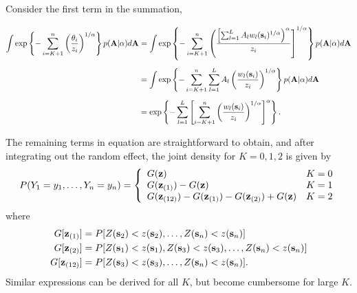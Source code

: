 \documentclass[11pt]{article}
\begin{document}
Consider the first term in the summation,

\begin{align}
	\int \exp \left\{ -\sum_{ i = K+1}^{ n }\left( \frac{ \theta_i }{ z_i } \right)^{1/\alpha} \right\} p( \mbox{\bf A} | \alpha) d\mbox{\bf A} &= \int \exp \left\{ - \sum_{ i = K + 1 }^n \left( \frac{ \left[ \sum_{ l = 1 }^L  A_l w_{l}(\mbox{\bf s}_i)^{1/\alpha} \right)^\alpha }{ z_i} \right]^{ 1/\alpha } \right \} p( \mbox{\bf A} | \alpha) d\mbox{\bf A} \nonumber \\[0.5em]
	 &= \int \exp \left\{ -\sum_{ i = K + 1}^n \sum_{ l = 1}^L A_l \left( \frac{ w_l (\mbox{\bf s}_i) }{ z_i } \right)^{1/\alpha} \right \} p( \mbox{\bf A} | \alpha) d\mbox{\bf A} \nonumber \\[0.5em]
	 &=\exp\left\{-\sum_{ l = 1}^L \left[ \sum_{ i = K + 1 }^n \left( \frac{ w_l(\mbox{\bf s}_i)}{ z_i} \right)^{1/\alpha} \right]^\alpha \right\}.
\end{align}

The remaining terms in equation  are straightforward to obtain, and after integrating out the random effect, the joint density for $K = 0, 1, 2$ is given by
\begin{align}\label{rbeq:pmf}
  P(Y_1=y_1,\ldots,Y_n=y_n) =  \left\{
    \begin{array}{ll}
      G(\mbox{\bf z}) & K=0 \\
      G(\mbox{\bf z}_{(1)})-G(\mbox{\bf z}) & K=1 \\
      G(\mbox{\bf z}_{(12)})-G(\mbox{\bf z}_{(1)})-G(\mbox{\bf z}_{(2)})+G(\mbox{\bf z}) & K=2
    \end{array}
  \right.
\end{align}
where
\begin{align*}
  G[\mbox{\bf z}_{(1)}] &= P[Z(\mbox{\bf s}_2)<z(\mbox{\bf s}_2),\ldots,Z(\mbox{\bf s}_n)<z(\mbox{\bf s}_n)] \\
  G[\mbox{\bf z}_{(2)}] &= P[Z(\mbox{\bf s}_1)<z(\mbox{\bf s}_1),Z(\mbox{\bf s}_3)<z(\mbox{\bf s}_3),\ldots,Z(\mbox{\bf s}_n)<z(\mbox{\bf s}_n)]\\
  G[\mbox{\bf z}_{(12)}] &= P[Z(\mbox{\bf s}_3)<z(\mbox{\bf s}_3),\ldots,Z(\mbox{\bf s}_n)<z(\mbox{\bf s}_n)].
\end{align*}
Similar expressions can be derived for all $K$, but become cumbersome for large $K$.
\end{document}
